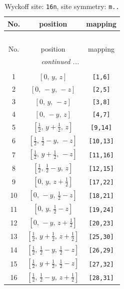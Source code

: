 \documentclass[fleqn,8pt]{jsarticle}
\begin{document}
\renewcommand{\arraystretch}{1.2}
\begin{longtable}{ccc}
\caption{Wyckoff site: {\tt 16n}, site symmetry: {\tt m..}}
 \\
 \hline \hline
No. & position & mapping \\ \hline \endfirsthead

\multicolumn{2}{l}{\tablename\ \thetable{}} \\
 \hline \hline
No. & position & mapping \\ \hline \endhead

 \hline \hline
\multicolumn{2}{r}{\footnotesize\it continued ...} \\ \endfoot

 \hline \hline
\multicolumn{2}{r}{} \\ \endlastfoot

1 & $\left[ 0,\, y,\, z \right]$ & {\tt [1,6]} \\ \hline
2 & $\left[ 0,\, - y,\, - z \right]$ & {\tt [2,5]} \\ \hline
3 & $\left[ 0,\, y,\, - z \right]$ & {\tt [3,8]} \\ \hline
4 & $\left[ 0,\, - y,\, z \right]$ & {\tt [4,7]} \\ \hline
5 & $\left[ \frac{1}{2},\, y + \frac{1}{2},\, z \right]$ & {\tt [9,14]} \\ \hline
6 & $\left[ \frac{1}{2},\, \frac{1}{2} - y,\, - z \right]$ & {\tt [10,13]} \\ \hline
7 & $\left[ \frac{1}{2},\, y + \frac{1}{2},\, - z \right]$ & {\tt [11,16]} \\ \hline
8 & $\left[ \frac{1}{2},\, \frac{1}{2} - y,\, z \right]$ & {\tt [12,15]} \\ \hline
9 & $\left[ 0,\, y,\, z + \frac{1}{2} \right]$ & {\tt [17,22]} \\ \hline
10 & $\left[ 0,\, - y,\, \frac{1}{2} - z \right]$ & {\tt [18,21]} \\ \hline
11 & $\left[ 0,\, y,\, \frac{1}{2} - z \right]$ & {\tt [19,24]} \\ \hline
12 & $\left[ 0,\, - y,\, z + \frac{1}{2} \right]$ & {\tt [20,23]} \\ \hline
13 & $\left[ \frac{1}{2},\, y + \frac{1}{2},\, z + \frac{1}{2} \right]$ & {\tt [25,30]} \\ \hline
14 & $\left[ \frac{1}{2},\, \frac{1}{2} - y,\, \frac{1}{2} - z \right]$ & {\tt [26,29]} \\ \hline
15 & $\left[ \frac{1}{2},\, y + \frac{1}{2},\, \frac{1}{2} - z \right]$ & {\tt [27,32]} \\ \hline
16 & $\left[ \frac{1}{2},\, \frac{1}{2} - y,\, z + \frac{1}{2} \right]$ & {\tt [28,31]} \\
\end{longtable}
\end{document}
